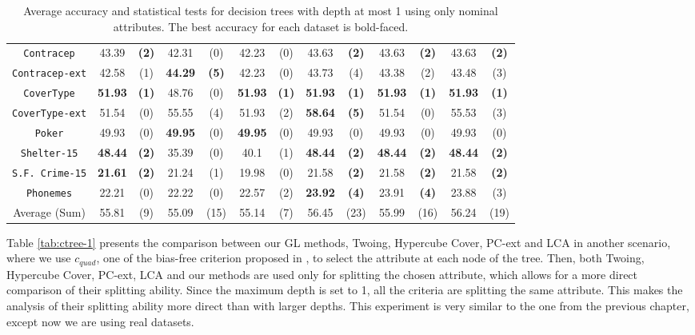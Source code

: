 \begin{table}
\begin{tabular}{c|cc|cc|cc|cc|cc|cc}
{\tt Contracep}     &  43.39       & {\bf (2)}    &  42.31       & (0)          &  42.23       & (0)              & 43.63      & {\bf (2)}     & 43.63      & {\bf (2)}  & 43.63       & {\bf (2)} \\
{\tt Contracep-ext} &  42.58       & (1)          &  {\bf 44.29} & {\bf (5)}    &  42.23       & (0)              & 43.73      & (4)           & 43.38      & (2)        & 43.48       & (3)       \\
{\tt CoverType}     &  {\bf 51.93} & {\bf (1)}    &  48.76       & (0)          & {\bf 51.93}  & {\bf (1)}        &{\bf 51.93} & {\bf (1)}     & {\bf 51.93}& {\bf (1)}  & {\bf 51.93} & {\bf (1)} \\
{\tt CoverType-ext} &  51.54       & (0)          &  55.55       & (4)          &  51.93       & (2)              &{\bf 58.64} & {\bf (5)}     & 51.54      & (0)        & 55.53       & (3)       \\
{\tt Poker}         &  49.93       & (0)          &  {\bf 49.95} & (0)          & {\bf 49.95}  & (0)              & 49.93      & (0)           & 49.93      & (0)        & 49.93       & (0)       \\
{\tt Shelter-15}    &  {\bf 48.44} & {\bf (2)}    &  35.39       & (0)          &  40.1        & (1)              &{\bf 48.44} & {\bf (2)}     & {\bf 48.44}& {\bf (2)}  & {\bf 48.44} & {\bf (2)} \\
{\tt S.F. Crime-15} &  {\bf 21.61} & {\bf (2)}    &  21.24       & (1)          & 19.98        & (0)              & 21.58      & {\bf (2)}     & 21.58      & {\bf (2)}  & 21.58       & {\bf (2)} \\
{\tt Phonemes}      &  22.21       & (0)          &  22.22       & (0)          & 22.57        & (2)              &{\bf 23.92} & {\bf (4)}     & 23.91      & {\bf (4)}  & 23.88       & (3)       \\
\hline
Average (Sum)       &  55.81       & (9)          &  55.09       & (15)         & 55.14        & (7)              &  56.45     & (23)          & 55.99      & (16)       & 56.24       & (19)
\end{tabular}
\normalsize
\caption{Average accuracy and statistical tests  for  decision trees with depth at most 1 using only nominal attributes. The best accuracy for each dataset is bold-faced.}
\label{tab:nominal-1}
\end{table}

Table \ref{tab:ctree-1} presents the 
comparison between our GL methods, Twoing, Hypercube Cover, PC-ext and LCA in another scenario,
where we use $c_{quad}$, one of the bias-free criterion proposed in \cite{Hothorn:2006:URP}, to select the attribute at each node of the tree. 
Then, both Twoing, Hypercube Cover, PC-ext, LCA and our methods are  used only for splitting the chosen attribute, which allows for a  more direct comparison of their splitting ability. Since the maximum depth is set to 1, all the criteria are splitting the same attribute. This makes the analysis of their splitting ability more direct than with larger depths. This experiment is very similar to the one from the previous chapter, except now we are using real datasets.

